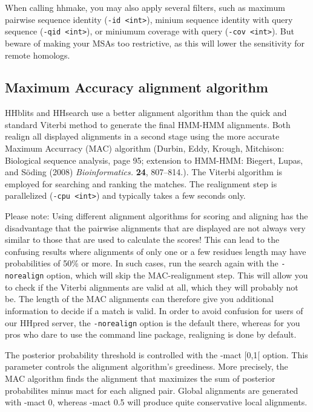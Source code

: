 \documentclass[11pt,a4paper]{article}
\begin{document}
When calling hhmake, you may also apply several filters, such as maximum pairwise 
sequence identity (\verb`-id <int>`), minium sequence identity with query sequence 
(\verb`-qid <int>`), or miniumum coverage with query (\verb`-cov <int>`). But beware 
of making your MSAs too restrictive, as this will lower the sensitivity for remote homologs.


\subsection{Maximum Accuracy alignment algorithm}

HHblits and HHsearch use a better alignment algorithm than the quick and 
standard Viterbi method to generate the final HMM-HMM alignments. Both realign
all displayed alignments in a second stage using the more accurate Maximum Accurracy 
(MAC) algorithm (Durbin, Eddy, Krough, Mitchison: Biological sequence analysis, page 
95; extension to HMM-HMM: Biegert, Lupas, and S\"oding (2008) \emph{Bioinformatics.} 
\textbf{24}, 807--814.). The Viterbi algorithm is employed for searching and ranking the 
matches. The realignment step is parallelized (\verb`-cpu <int>`) and typically takes a 
few seconds only.    

Please note: Using different alignment algorithms for scoring and aligning has the 
disadvantage that the pairwise alignments that are displayed are not always very similar to 
those that are used to calculate the scores! This can lead to the confusing results 
where alignments of only one or a few residues length may have probabilities of 50\% 
or more. In such cases, run the search again with the \verb`-norealign` option, which will 
skip the MAC-realignment step. This will allow you to check if the Viterbi alignments 
are valid at all, which they will probably not be. The length of the MAC alignments 
can therefore give you additional information to decide if a match is valid. In order
to avoid confusion for users of our HHpred server, the \verb`-norealign` option is the 
default there, whereas for you pros who dare to use the command line package, 
realigning is done by default.

The posterior probability threshold is controlled with the -mact [0,1[ option. 
This parameter controls the alignment algorithm's greediness. More precisely, the 
MAC algorithm finds the alignment that maximizes the sum of posterior probabilites 
minus mact for each aligned pair. Global alignments are generated with -mact 0, 
whereas -mact 0.5 will produce quite conservative local alignments. 
\end{document}
